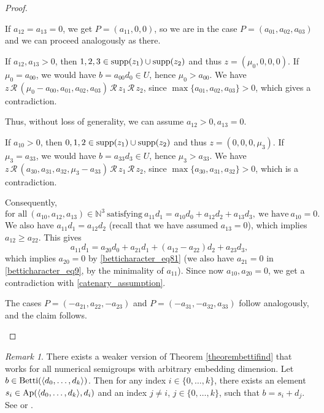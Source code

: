 \documentclass[12pt]{article}
\theoremstyle{remark}
\newtheorem{remark}[thm]{Remark}
\begin{document}
\begin{proof}
\begin{itemize}
        If $a_{12} = a_{13} = 0$, we get $P = (a_{11},0,0)$, so we are in the case $P = (a_{01},a_{02},a_{03})$ and we can proceed analogously as there. 
        
        If $a_{12},a_{13}>0$, then $1,2,3 \in \textup{supp}(z_1) \cup \textup{supp}(z_2)$ and thus $z = (\mu_0,0,0,0)$. If $\mu_0 = a_{00}$, we would have $b = a_{00}d_0 \in U$, hence $\mu_0 > a_{00}$. We have $z   \, \mathcal{R} \, (\mu_0-a_{00}, a_{01}, a_{02}, a_{03}) \, \mathcal{R} \, z_1  \, \mathcal{R} \, z_2$, since $\max\{a_{01}, a_{02}, a_{03}\} > 0$, which gives a contradiction. 
        
        Thus, without loss of generality, we can assume $a_{12}>0, a_{13} = 0$. 
        
        If $a_{10}>0$, then $0,1,2 \in \textup{supp}(z_1) \cup \textup{supp}(z_2)$ and thus $z = (0,0,0,\mu_3)$. 
        If $\mu_3 = a_{33}$, we would have $b = a_{33}d_3 \in U$, hence $\mu_3 > a_{33}$. We have $z \, \mathcal{R} \, (a_{30},a_{31},a_{32},\mu_3-a_{33}) \, \mathcal{R} \, z_1  \, \mathcal{R} \, z_2$, since $\max\{a_{30},a_{31},a_{32}\}>0$, which is a contradiction.  
        
        Consequently,
        \begin{equation}\label{betticharacter_eq81}
            \text{for all} \ (a_{10},a_{12},a_{13}) \in \mathbb{N}^3 \ \text{satisfying} \ a_{11}d_1 = a_{10}d_0 + a_{12}d_2 + a_{13}d_3, \ \text{we have} \ a_{10}=0.
        \end{equation}
        We also have $a_{11}d_1 = a_{12}d_2$ (recall that we have assumed $a_{13} = 0$), which implies $a_{12} \geq a_{22}$. This gives
        \begin{equation}\label{betticharacter_eq9}
            a_{11}d_1 = a_{20}d_0 + a_{21}d_1 + (a_{12}-a_{22})d_2 + a_{23}d_3,
        \end{equation}
        which implies $a_{20}=0$ by \eqref{betticharacter_eq81} (we also have $a_{21} = 0$ in \eqref{betticharacter_eq9}, by the minimality of $a_{11}$). Since now $a_{10},a_{20} = 0$, we get a contradiction with \eqref{catenary_assumption}.


    The cases $P = (-a_{21},a_{22},-a_{23})$ and $P = (-a_{31},-a_{32},a_{33})$ follow analogously, and the claim follows.
\end{itemize}
\end{proof}

\begin{remark}\label{remarkcatenary}
    There exists a weaker version of Theorem \ref{theorembettifind} that works for all numerical semigroups with arbitrary embedding dimension.
    Let $b \in \textup{Betti}(\langle d_0, \dots, d_k \rangle)$. Then for any index $i \in \{0,\dots,k\}$, there exists an element $s_i \in \textup{Ap}(\langle d_0, \dots, d_k \rangle,d_i)$ and an index $j \neq i$, $ j\in \{0,\dots,k\}$, such that $b = s_i + d_j$. See \cite[Proposition 2.2]{Rosales1996MinimalRelation} or \cite[Proposition 66]{AssiDAnnaGarciaSanchez2020}.
\end{remark}
\end{document}
